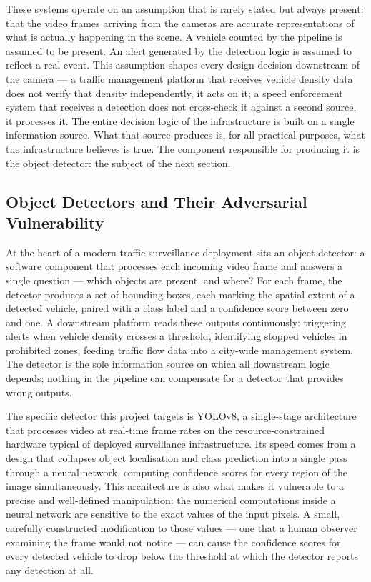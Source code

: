 \documentclass[12pt,a4paper]{report}
\begin{document}
These systems operate on an assumption that is rarely stated but
always present: that the video frames arriving from the cameras
are accurate representations of what is actually happening in the
scene. A vehicle counted by the pipeline is assumed to be present.
An alert generated by the detection logic is assumed to reflect a
real event. This assumption shapes every design decision downstream
of the camera --- a traffic management platform that receives
vehicle density data does not verify that density independently,
it acts on it; a speed enforcement system that receives a
detection does not cross-check it against a second source, it
processes it. The entire decision logic of the infrastructure is
built on a single information source. What that source produces
is, for all practical purposes, what the infrastructure believes
is true. The component responsible for producing it is the object
detector: the subject of the next section.

\subsection{Object Detectors and Their Adversarial Vulnerability}
\label{sec:detectors}

At the heart of a modern traffic surveillance deployment sits an
object detector: a software component that processes each incoming
video frame and answers a single question --- which objects are
present, and where? For each frame, the detector produces a set of
bounding boxes, each marking the spatial extent of a detected
vehicle, paired with a class label and a confidence score between
zero and one. A downstream platform reads these outputs
continuously: triggering alerts when vehicle density crosses a
threshold, identifying stopped vehicles in prohibited zones,
feeding traffic flow data into a city-wide management system.
The detector is the sole information source on which all downstream
logic depends; nothing in the pipeline can compensate for a
detector that provides wrong outputs.

The specific detector this project targets is YOLOv8, a
single-stage architecture that processes video at real-time frame
rates on the resource-constrained hardware typical of deployed
surveillance infrastructure. Its speed comes from a design that
collapses object localisation and class prediction into a single
pass through a neural network, computing confidence scores for
every region of the image simultaneously. This architecture is
also what makes it vulnerable to a precise and well-defined
manipulation: the numerical computations inside a neural network
are sensitive to the exact values of the input pixels. A small,
carefully constructed modification to those values --- one that a
human observer examining the frame would not notice --- can cause
the confidence scores for every detected vehicle to drop below
the threshold at which the detector reports any detection at all.
\end{document}
